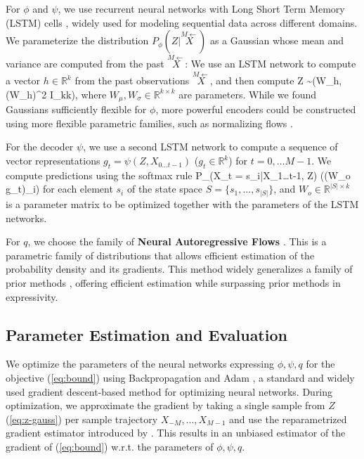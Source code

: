 \documentclass[entropy,article,submit,moreauthors,pdftex,10pt,a4paper]{Definitions/mdpi}
\newcommand{\key}{\textbf}
\newcommand{\finitepast}{\stackrel{\scriptscriptstyle{M}\leftarrow}{X}}%
\let\oldequation\equation
\let\oldendequation\endequation
\renewenvironment{equation}
  {\linenomathNonumbers\oldequation}
  {\oldendequation\endlinenomath}
\begin{document}
For $\phi$ and $\psi$, we use recurrent neural networks with Long Short Term Memory (LSTM) cells \citep{hochreiter-long-1997}, widely used for modeling sequential data across different domains.
We parameterize the distribution $P_\phi(Z|\finitepast)$ as a Gaussian whose mean and variance are computed from the past $\finitepast$:
We use an LSTM network to compute a vector $h \in \mathbb{R}^k$ from the past observations $\finitepast$, and then compute
\begin{equation}\label{eq:z-gauss}
	Z \sim {}(W_\mu h, (W_\sigma h)^2 I_{k\times k}),
\end{equation}
where $W_\mu, W_\sigma \in \mathbb{R}^{k\times k}$ are parameters.
While we found Gaussians sufficiently flexible for $\phi$, more powerful encoders could be constructed using more flexible parametric families, such as normalizing flows \citep{rezende-variational-2015, kingma-improving-2016}.

For the decoder $\psi$, we use a second LSTM network to compute a sequence of vector representations $g_t = \psi(Z, X_{0\dots t-1})$ ($g_t \in \mathbb{R}^k$) for $t = 0, \dots M-1$.
We compute predictions using the softmax rule 
\begin{equation}
	P_\psi(X_t = s_i|X_{1\dots t-1}, Z) \propto \exp((W_o g_t)_i)
\end{equation}
for each element $s_i$ of the state space $S = \{s_1, ..., s_{|S|}\}$, and $W_o \in \mathbb{R}^{|S| \times k}$ is a parameter matrix to be optimized together with the parameters of the LSTM networks.


For $q$, we choose the family of \key{Neural Autoregressive Flows} \citep{huang-neural-2018}. 
This is a parametric family of distributions that allows efficient estimation of the probability density and its gradients.
This method widely generalizes a family of prior methods \citep{rezende-variational-2015, kingma-improving-2016, papamakarios-masked-2017}, offering efficient estimation while surpassing prior methods in expressivity.


\subsection{Parameter Estimation and Evaluation}
We optimize the parameters of the neural networks expressing $\phi, \psi, q$ for the objective (\ref{eq:bound}) using Backpropagation and Adam \citep{kingma-adam:-2014}, a standard and widely used gradient descent-based method for optimizing neural networks.
During optimization, we approximate the gradient by taking a single sample from $Z$ (\ref{eq:z-gauss}) per sample trajectory $X_{-M}, \dots, X_{M-1}$ and use the reparametrized gradient estimator introduced by \citet{kingma-auto-encoding-2014}.
This results in an unbiased estimator of the gradient of (\ref{eq:bound}) w.r.t. the parameters of $\phi, \psi, q$.
\end{document}
